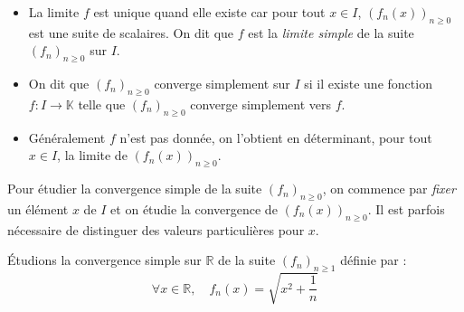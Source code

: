 \documentclass[a4paper,10pt]{report}
\begin{document}
\begin{Remarques}{}
\begin{itemize} 
\item La limite $f$ est unique quand elle existe car pour tout $x \in I$, $(f_n(x))_{n \geq 0}$ est une suite de scalaires. On dit que $f$ est la \emph{limite simple} de la suite $(f_n)_{n \geq 0}$ sur $I$.
\item On dit que $(f_n)_{n \geq 0}$ converge simplement sur $I$ si il existe une fonction $f : I \rightarrow \mathbb{K}$ telle que $(f_n)_{n \geq 0}$ converge simplement vers $f$.
\item Généralement $f$ n'est pas donnée, on l'obtient en déterminant, pour tout $x \in I$, la limite de $(f_n(x))_{n \geq 0}$.
\end{itemize}
\end{Remarques}{}

\begin{metho} Pour étudier la convergence simple de la suite $(f_n)_{n \geq 0}$, on commence par \emph{fixer} un élément $x$ de $I$ et on étudie la convergence de $(f_n(x))_{n \geq 0}$. Il est parfois nécessaire de distinguer des valeurs particulières pour $x$.
\end{metho}

\medskip

\begin{Exemple}\label{PremierEx} Étudions la convergence simple sur $\mathbb{R}$ de la suite $(f_n)_{n \geq 1}$ définie par :
$$ \forall x \in \mathbb{R}, \quad f_n(x) = \sqrt{x^2 + \frac{1}{n}}$$

\medskip

\vspace{7.5cm}

\end{Exemple}
\end{document}
